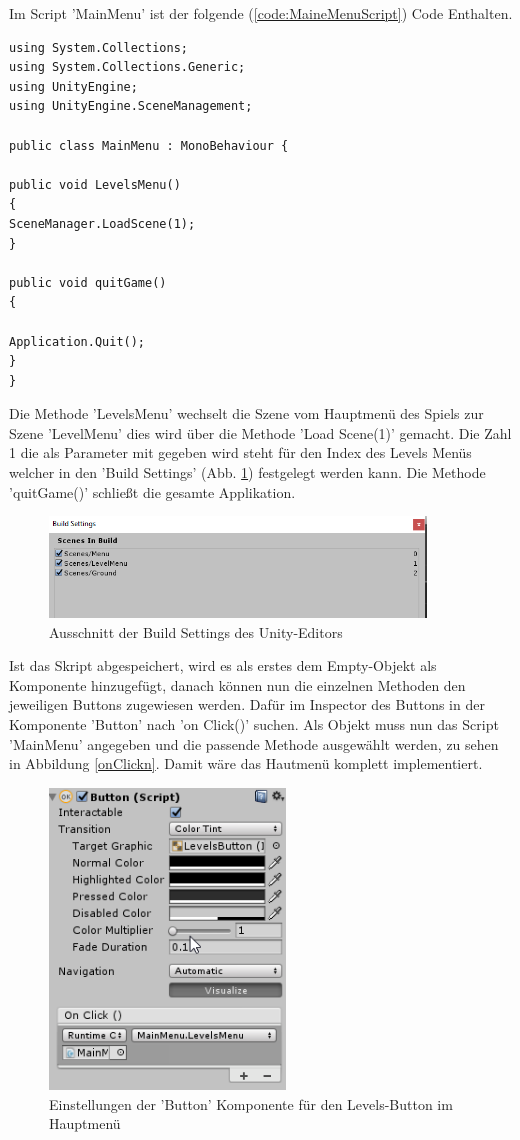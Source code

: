 Im Script 'MainMenu' ist der folgende (\cref{code:MaineMenuScript}) Code Enthalten.

\begin{lstlisting}[language={[Sharp]C}, caption=MainMenu-Script, label=code:MaineMenuScript]
using System.Collections;
using System.Collections.Generic;
using UnityEngine;
using UnityEngine.SceneManagement;

public class MainMenu : MonoBehaviour {

public void LevelsMenu()
{
SceneManager.LoadScene(1);
}

public void quitGame()
{

Application.Quit();
}
}

\end{lstlisting}

Die Methode 'LevelsMenu' wechselt die Szene vom Hauptmenü des Spiels zur Szene 'LevelMenu' dies wird über die Methode 'Load Scene(1)' gemacht. Die Zahl 1 die als Parameter mit gegeben wird steht für den Index des Levels Menüs welcher in den 'Build Settings' (Abb. \ref{BuildSettings}) festgelegt werden kann. Die Methode 'quitGame()' schließt die gesamte Applikation.
\begin{figure}[H]
	\includegraphics[width=10cm]{images/BuildSettings.png}
	\caption{Ausschnitt der Build Settings des Unity-Editors}
	\label{BuildSettings}
\end{figure}

Ist das Skript abgespeichert, wird es als erstes dem Empty-Objekt als Komponente hinzugefügt, danach können nun die einzelnen Methoden den jeweiligen Buttons zugewiesen werden. Dafür im Inspector des Buttons in der Komponente 'Button' nach 'on Click()' suchen. Als Objekt muss nun das Script 'MainMenu' angegeben und die passende Methode ausgewählt werden, zu sehen in Abbildung \ref{onClickn}. Damit wäre das Hautmenü komplett implementiert.

\begin{figure}[H]
	\includegraphics[height=8cm]{images/ButtonScriptLevelsButton.png}
	\caption{Einstellungen der 'Button' Komponente für den Levels-Button im Hauptmenü}
	\label{onClick}
\end{figure}


